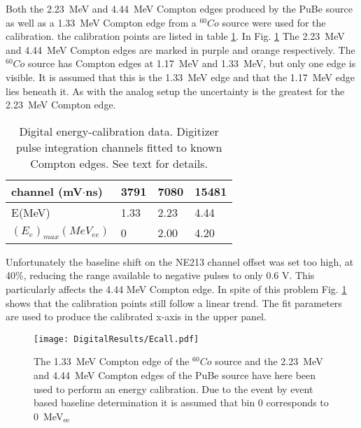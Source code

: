 \documentclass[main.tex]{subfiles}
\begin{document}
Both the \SI{2.23}{\MeV} and \SI{4.44}{\MeV} Compton edges produced by the PuBe source as well as a \SI{1.33}{MeV} Compton edge from a $^{60}Co$ source were used for the calibration. the calibration points are listed in table \ref{tab:knox_d}. In Fig. \ref{fig:D_QDC} The \SI{2.23}{\MeV} and \SI{4.44}{\MeV} Compton edges are marked in purple and orange respectively. The $^{60}Co$ source has Compton edges at \SI{1.17}{\MeV} and \SI{1.33}{\MeV}, but only one edge is visible. It is assumed that this is the \SI{1.33}{\MeV} edge and that the \SI{1.17}{\MeV} edge lies beneath it. As with the analog setup the uncertainty is the greatest for the \SI{2.23}{\MeV} Compton edge.

\begin{table}[hb]
	\center
	\begin{tabular}{|l|l|l|l|}
	\hline
	channel (mV$\cdot$ns)            & 3791 & 7080  & 15481  \\
	\hline
	E(MeV)          & 1.33    & 2.23  & 4.44 \\
	\hline
	$(E_{e})_{max}(MeV_{ee})$ & 0    & 2.00  & 4.20 \\
	\hline
	\end{tabular}
   	\captionsetup{width=0.435\linewidth}
	\caption[Digital energy-calibration data.]{Digital energy-calibration data. Digitizer pulse integration channels fitted to known Compton edges. See text for details.}
	\label{tab:knox_d}
\end{table}

Unfortunately the baseline shift on the NE213 channel offset was set too high, at 40\%, reducing the range available to negative pulses to only 0.6 V. This particularly affects the 4.44 \si{\MeV} Compton edge. In spite of this problem Fig. \ref{fig:D_QDC} shows that the calibration points still follow a linear trend. The fit parameters are used to produce the calibrated x-axis in the upper panel.

\begin{figure}[ht]
    \centering
        \texttt{[image: DigitalResults/Ecall.pdf]}
        \caption[Energy calibration of the digital setup]{The \SI{1.33}{\MeV} Compton edge of the $^{60}Co$ source and the \SI{2.23}{\MeV} and \SI{4.44}{\MeV} Compton edges of the PuBe source have here been used to perform an energy calibration. Due to the event by event based baseline determination it is assumed that bin 0 corresponds to \SI{0}{\MeV}$_\text{ee}$}
    \label{fig:D_QDC}
\end{figure}
\end{document}
